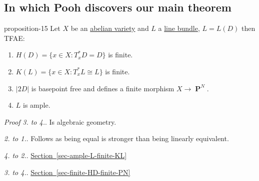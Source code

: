 \documentclass[10pt,]{book}
\makeatletter
\renewcommand*{\proofname}{Proof}
\renewenvironment{proof}[1][\proofname]{\par
  \pushQED{\qed}%
  \normalfont \topsep6\p@\@plus6\p@\relax
  \trivlist
  \item\relax
    {\itshape
    #1\@addpunct{.}}\hspace\labelsep\ignorespaces
}{%
  \popQED\endtrivlist\@endpefalse
}
\numberwithin{equation}{section}
\DeclareMathOperator{\PP}{\mathbf{P}}
\makeatother
\begin{document}
\subsection[{In which Pooh discovers our main theorem}]{In which Pooh discovers our main theorem}\label{subsection-14}
\begin{proposition}{}{}{proposition-15}%
\hypertarget{p-141}{}%
Let \(X\) be an \hyperref[def-buntes-abvar]{abelian variety} and \(L\) a \hyperref[def-line-bundle]{line bundle}, \(L = L(D)\) then TFAE:\leavevmode%
\begin{enumerate}
\item\hypertarget{li-23}{}\(H(D) = \{x\in X: T_x^*D  = D \}\) is finite.%
\item\hypertarget{li-24}{}\(K(L) = \{x\in X: T_x^*L  \cong L \}\) is finite.%
\item\hypertarget{li-25}{}\(|2D|\) is basepoint free and defines a finite morphism \(X\to \PP^N\).%
\item\hypertarget{li-26}{}\(L\) is ample.%
\end{enumerate}
%
\end{proposition}
\begin{proof}\hypertarget{proof-25}{}
\hypertarget{case-1}{}\textit{3. to 4.}. \hypertarget{p-142}{}%
Is algebraic geometry.%
\par\medskip\noindent
\hypertarget{case-2}{}\textit{2. to 1.}. \hypertarget{p-143}{}%
Follows as being equal is stronger than being linearly equivalent.%
\par\medskip\noindent
\hypertarget{case-3}{}\textit{4. to 2.}. \hypertarget{p-144}{}%
\hyperref[sec-ample-L-finite-KL]{Section~\ref{sec-ample-L-finite-KL}}%
\par\medskip\noindent
\hypertarget{case-4}{}\textit{3. to 4.}. \hypertarget{p-145}{}%
\hyperref[sec-finite-HD-finite-PN]{Section~\ref{sec-finite-HD-finite-PN}}%
\end{proof}
%
%
\typeout{************************************************}
\typeout{************************************************}
%
\end{document}
